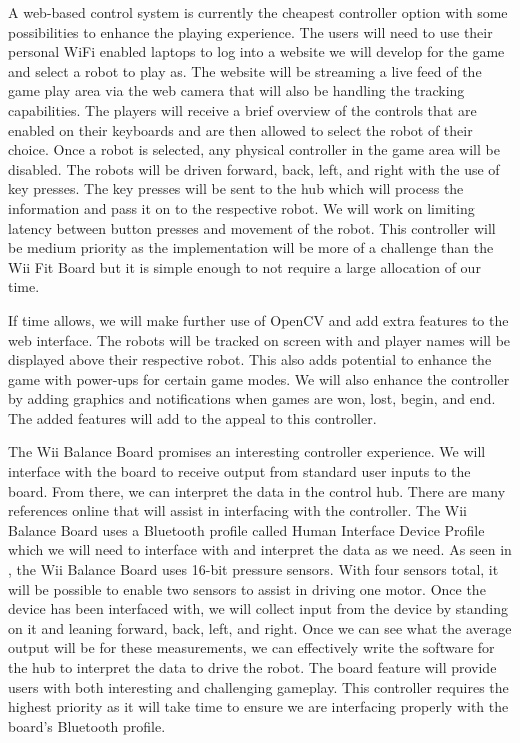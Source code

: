 \documentclass[11pt]{ieeeconf}
\begin{document}
A web-based control system is currently the cheapest controller option with some possibilities to enhance the playing experience. The users will need to use their personal WiFi enabled laptops to log into a website we will develop for the game and select a robot to play as. The website will be streaming a live feed of the game play area via the web camera that will also be handling the tracking capabilities. The players will receive a brief overview of the controls that are enabled on their keyboards and are then allowed to select the robot of their choice. Once a robot is selected, any physical controller in the game area will be disabled. The robots will be driven forward, back, left, and right with the use of key presses. The key presses will be sent to the hub which will process the information and pass it on to the respective robot. We will work on limiting latency between button presses and movement of the robot. This controller will be medium priority as the implementation will be more of a challenge than the Wii Fit Board but it is simple enough to not require a large allocation of our time.

If time allows, we will make further use of OpenCV and add extra features to the web interface. The robots will be tracked on screen with and player names will be displayed above their respective robot. This also adds potential to enhance the game with power-ups for certain game modes. We will also enhance the controller by adding graphics and notifications when games are won, lost, begin, and end. The added features will add to the appeal to this controller.

The Wii Balance Board promises an interesting controller experience. We will interface with the board to receive output from standard user inputs to the board. From there, we can interpret the data in the control hub. There are many references online that will assist in interfacing with the controller. The Wii Balance Board uses a Bluetooth profile called Human Interface Device Profile which we will need to interface with and interpret the data as we need. As seen in \cite{homebrew}, the Wii Balance Board uses 16-bit pressure sensors. With four sensors total, it will be possible to enable two sensors to assist in driving one motor. Once the device has been interfaced with, we will collect input from the device by standing on it and leaning forward, back, left, and right. Once we can see what the average output will be for these measurements, we can effectively write the software for the hub to interpret the data to drive the robot. The board feature will provide users with both interesting and challenging gameplay. This controller requires the highest priority as it will take time to ensure we are interfacing properly with the board's Bluetooth profile. 
\end{document}
